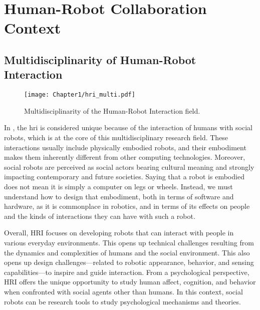 \ifdefined{}
\else
\setcounter{chapter}{0}
\dominitoc
\faketableofcontents
\fi

\chapter{Human-Robot Collaboration Context}
\label{chap:1}
\minitoc


\section{Multidisciplinarity of Human-Robot Interaction}

\begin{figure}
    \center
    \texttt{[image: Chapter1/hri\_multi.pdf]}
    \caption{Multidisciplinarity of the Human-Robot Interaction field.}
    \label{fig:hri_multi}
\end{figure}

In \cite{bartneck_human_robot_2020}, the \acrfull{hri} is considered unique because of the interaction of humans with social robots, which is at the core of this multidisciplinary research field. These interactions usually include physically embodied robots, and their embodiment makes them inherently different from other computing technologies. Moreover, social robots are perceived as social actors bearing cultural meaning and strongly impacting contemporary and future societies. Saying that a robot is embodied does not mean it is simply a computer on legs or wheels. Instead, we must understand how to design that embodiment, both in terms of software and hardware, as it is commonplace in robotics, and in terms of its effects on people and the kinds of interactions they can have with such a robot.

Overall, HRI focuses on developing robots that can interact with people in various everyday environments. This opens up technical challenges resulting from the dynamics and complexities of humans and the social environment. This also opens up design challenges—related to robotic appearance, behavior, and sensing capabilities—to inspire and guide interaction. From a psychological perspective, HRI offers the unique opportunity to study human affect, cognition, and behavior when confronted with social agents other than humans. In this context, social robots can be research tools to study psychological mechanisms and theories.

